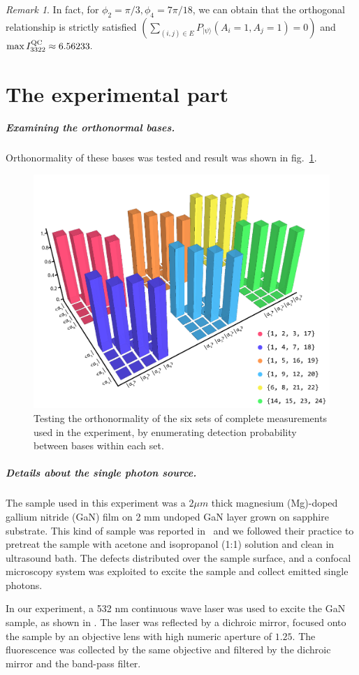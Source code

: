 \documentclass[pra,aps,notitlepage,superscriptaddress,showpacs,showkeys]{revtex4-1}
\theoremstyle{definition}
\theoremstyle{remark}
\newtheorem{remark}{Remark}
\begin{document}
\begin{remark}
In fact, for $\phi_{2}= \pi/3,\phi_{4}=7\pi/18$, we can obtain that the orthogonal relationship is strictly satisfied  $(\sum_{(i,j)\in E}P_{|\psi\rangle}(A_i=1,A_j=1)=0)$ and $\max I_{3322}^{\rm QC}\approx 6.56233.$
\end{remark}

\section{The experimental part}

\subparagraph{Examining the orthonormal bases.} Orthonormality of these bases was tested and result was shown in fig.~\ref{fig:exp-res-1}.

 \begin{figure}[htbp]
     \centering
     \includegraphics[width = .53\columnwidth] {fig/exp-res-1.pdf}
     \caption{Testing the orthonormality of the six sets of complete measurements used in the experiment, by enumerating detection probability between bases within each set.}
     \label{fig:exp-res-1}
 \end{figure}

 \subparagraph{Details about the single photon source.}
 The sample used in this experiment was a $2\mu m$ thick magnesium (Mg)-doped gallium nitride (GaN) film on 2 mm undoped GaN layer grown on sapphire substrate.
 This kind of sample was reported in~\cite{qli18s} and we followed their practice to pretreat the sample with acetone and isopropanol (1:1) solution and clean in ultrasound bath.
 The defects distributed over the sample surface, and a confocal microscopy system was exploited to excite the sample and collect emitted single photons.

 In our experiment, a 532 nm continuous wave laser was used to excite the GaN sample, as shown in \cite{MT}. The laser was reflected by a dichroic mirror, focused onto the sample by an objective lens with high numeric aperture of $1.25$. The fluorescence was collected by the same objective and filtered by the dichroic mirror and the band-pass filter.
\end{document}
